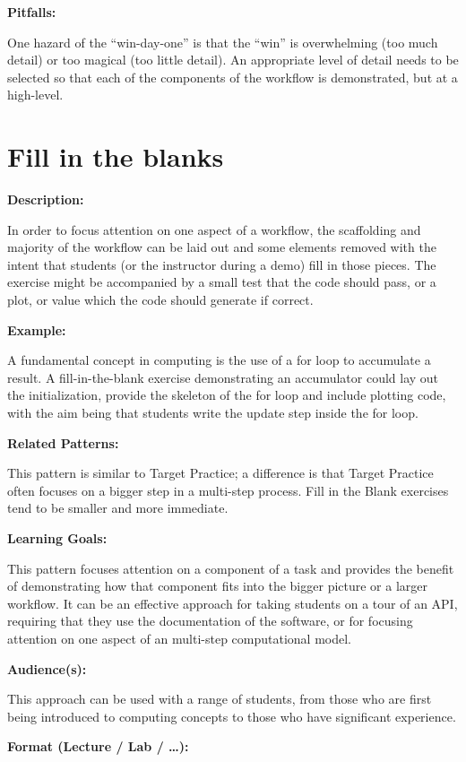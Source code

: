 \documentclass[]{book}
\begin{document}
\textbf{Pitfalls:}

One hazard of the ``win-day-one'' is that the ``win'' is overwhelming
(too much detail) or too magical (too little detail). An appropriate
level of detail needs to be selected so that each of the components of
the workflow is demonstrated, but at a high-level.

\section{Fill in the blanks}\label{fill-in-the-blanks}

\textbf{Description:}

In order to focus attention on one aspect of a workflow, the scaffolding
and majority of the workflow can be laid out and some elements removed
with the intent that students (or the instructor during a demo) fill in
those pieces. The exercise might be accompanied by a small test that the
code should pass, or a plot, or value which the code should generate if
correct.

\textbf{Example:}

A fundamental concept in computing is the use of a for loop to
accumulate a result. A fill-in-the-blank exercise demonstrating an
accumulator could lay out the initialization, provide the skeleton of
the for loop and include plotting code, with the aim being that students
write the update step inside the for loop.

\textbf{Related Patterns:}

This pattern is similar to Target Practice; a difference is that Target
Practice often focuses on a bigger step in a multi-step process. Fill in
the Blank exercises tend to be smaller and more immediate.

\textbf{Learning Goals:}

This pattern focuses attention on a component of a task and provides the
benefit of demonstrating how that component fits into the bigger picture
or a larger workflow. It can be an effective approach for taking
students on a tour of an API, requiring that they use the documentation
of the software, or for focusing attention on one aspect of an
multi-step computational model.

\textbf{Audience(s):}

This approach can be used with a range of students, from those who are
first being introduced to computing concepts to those who have
significant experience.

\textbf{Format (Lecture / Lab / \ldots{}):}
\end{document}
